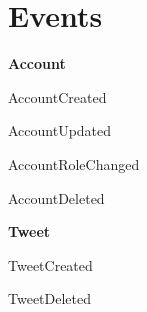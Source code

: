\chapter{Events}

\begin{teitemize}
    \item \textbf{Account}
    \begin{teitemize}
        \item AccountCreated
        \item AccountUpdated
        \item AccountRoleChanged
        \item AccountDeleted
    \end{teitemize}
    \item \textbf{Tweet}
    \begin{teitemize}
        \item TweetCreated
        \item TweetDeleted
    \end{teitemize}
\end{teitemize}